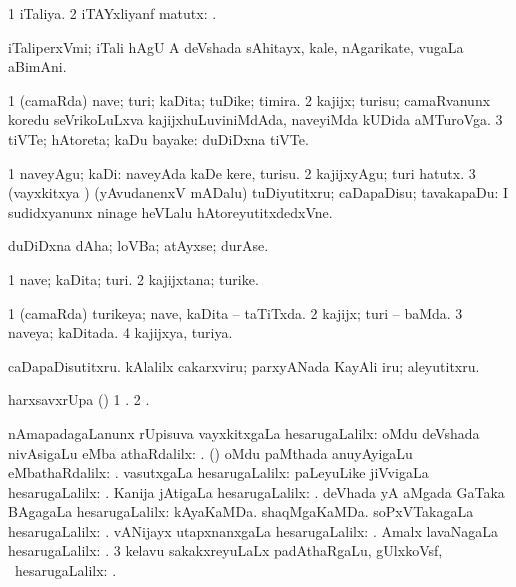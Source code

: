 \bentry
{}
\gl{\sapUpa}
\bmng
\bnum
\num{1} iTaliya. 
\num{2} iTAYxliyanf matutx: . 
\enum
\emng
\eentry

\bentry
{}
\gl{\nA}
\bmng
iTaliperxVmi; iTali hAgU A deVshada sAhitayx, kale, nAgarikate, \mo vugaLa aBimAni. 
\emng
\eentry

\bentry
{}
\gl{\nA}
\bmng
\bnum
\num{1} (camaRda) nave; turi; kaDita; tuDike; timira. 
\num{2} kajijx; turisu; camaRvanunx koredu seVrikoLuLxva kajijxhuLuviniMdAda, naveyiMda kUDida aMTuroVga. 
\num{3} tiVTe; hAtoreta; kaDu bayake:  duDiDxna tiVTe. 
\enum
\emng
\eentry

\bentry
{}
\gl{\akirx}
\bmng
\bnum
\num{1} naveyAgu; kaDi:  naveyAda kaDe kere, turisu. 
\num{2} kajijxyAgu; turi hatutx. 
\num{3} (vayxkitxya \vi) (yAvudanenxV mADalu) tuDiyutitxru; caDapaDisu; tavakapaDu:  I sudidxyanunx ninage heVLalu hAtoreyutitxdedxVne. 
\enum
\emng

\noindent 
\gl{\nuga}
\bmng
{} duDiDxna dAha; loVBa; atAyxse; durAse. 
\emng
\eentry

\bentry
{}
\gl{\nA}
\bmng
\bnum
\num{1} nave; kaDita; turi. 
\num{2} kajijxtana; turike. 
\enum
\emng
\eentry

\bentry
{}
\gl{\gu}
\bmng
\bnum
\num{1} (camaRda) turikeya; nave, kaDita -- taTiTxda. 
\num{2} kajijx; turi -- baMda. 
\num{3} naveya; kaDitada. 
\num{4} kajijxya, turiya. 
\enum
\emng

\noindent 
\gl{\nuga}
\bmng
{} 
\banum
{} caDapaDisutitxru. 
 kAlalilx cakarxviru; parxyANada KayAli iru; aleyutitxru. 
\eanum
\emng
\eentry

\bentry
{}
\gl{}
\bmng
harxsavxrUpa (\AmA) 
\bnum
\num{1} . 
\num{2} . 
\enum
\emng
\eentry

\bentry
{}
\gl{\uparx}
\bmng
nAmapadagaLanunx rUpisuva \uparx 
\bnum
{} vayxkitxgaLa hesarugaLalilx: 
\banum
{} oMdu deVshada nivAsigaLu eMba athaRdalilx: . 
 (\hiV) oMdu paMthada anuyAyigaLu eMbathaRdalilx: . 
\eanum
\numie
{} vasutxgaLa hesarugaLalilx: 
\banum
{} paLeyuLike jiVvigaLa hesarugaLalilx: . 
 Kanija jAtigaLa hesarugaLalilx: . 
 deVhada yA aMgada GaTaka BAgagaLa hesarugaLalilx:  kAyaKaMDa.  shaqMgaKaMDa. 
 soPxVTakagaLa hesarugaLalilx: . 
 vANijayx utapxnanxgaLa hesarugaLalilx: . 
 Amalx lavaNagaLa hesarugaLalilx: . 
\eanum
\numie
\num{3} kelavu sakakxreyuLaLx padAthaRgaLu, gUlxkoVsf, \mo\ hesarugaLalilx: . 
\enum
\emng
\eentry

